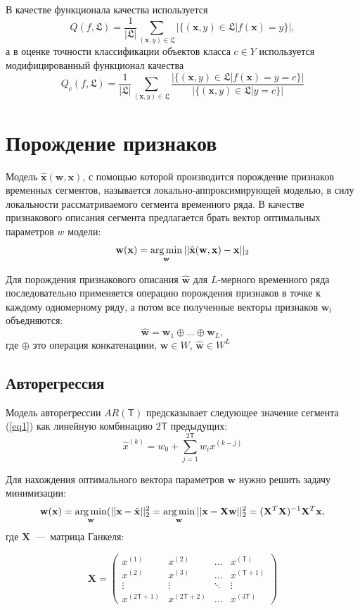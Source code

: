 \documentclass[12pt, twoside]{article}
\begin{document}
В качестве функционала качества используется 
$$Q(f,\mathfrak{L})=\frac{1}{|\mathfrak{L}|}\sum\limits_{(\mathbf{x},y)\in\mathfrak{L}}|\{(\mathbf{x},y)\in\mathfrak{L}|f(\mathbf{x})=y\}|,$$ 
а в оценке точности классификации объектов класса $c\in Y$ используется модифицированный функционал качества 
$$Q_c(f,\mathfrak{L})=\frac{1}{|\mathfrak{L}|}\sum\limits_{(\mathbf{x},y)\in\mathfrak{L}}\frac{|\{(\mathbf{x},y)\in\mathfrak{L}|f(\mathbf{x})=y=c\}|}{|\{(\mathbf{x},y)\in\mathfrak{L}|y=c\}|}$$


\section{Порождение признаков}

Модель $\hat{\mathbf{x}}(\mathbf{w},\mathbf{x})$, с помощью которой производится порождение признаков временных сегментов, называется локально-аппроксимирующей моделью, в силу локальности рассматриваемого сегмента временного ряда. В качестве признакового описания сегмента предлагается брать вектор оптимальных параметров $w$ модели: 
$$\mathbf{w}(\mathbf{x})=\argmin\limits_{\mathbf{w}}||\hat{\mathbf{x}}(\mathbf{w},\mathbf{x})-\mathbf{x}||_2$$

Для порождения признакового описания $\hat{\mathbf{w}}$ для $L$-мерного временного ряда последовательно применяется операцию порождения признаков в точке к каждому одномерному ряду, а потом все полученные векторы признаков $\mathbf{w}_l$ объедняются:
$$\hat{\mathbf{w}} = \mathbf{w}_1\oplus \ldots \oplus \mathbf{w}_L,$$
где $\oplus$ это операция конкатенациии, $\mathbf{w}\in W$, $\hat{\mathbf{w}} \in W^L$


\subsection{Авторегрессия}
Модель авторегрессии $AR(\mathsf{T})$ предсказывает следующее значение сегмента (\ref{eq1}) как линейную комбинацию $2\mathsf{T}$ предыдущих:
$$\hat{x}^{(k)}=w_0+\sum\limits_{j=1}^{2\mathsf{T}} w_i x^{(k-j)}$$

Для нахождения оптимального вектора параметров $\mathbf{w}$ нужно решить задачу минимизации:
$$\mathbf{w}(\mathbf{x})=\argmin_{\mathbf{w}}(||\mathbf{x}-\hat{\mathbf{x}}||_2^2=\argmin_{\mathbf{w}}||\mathbf{x}-\mathbf{X}\mathbf{w}||_2^2=(\mathbf{X}^T\mathbf{X})^{-1}\mathbf{X}^T\mathbf{x},$$
где $\mathbf{X}$~---~матрица Ганкеля:

\begin{equation*}
\mathbf{X} = \left(
\begin{array}{cccc}
x^{(1)} & x^{(2)} & \ldots & x^{(\mathsf{T})}\\
x^{(2)} & x^{(3)} & \ldots & x^{(\mathsf{T}+1)}\\
\vdots & \vdots & \ddots & \vdots\\
x^{(2\mathsf{T}+1)} & x^{(2\mathsf{T}+2)} & \ldots & x^{(3\mathsf{T})}
\end{array}
\right)
\end{equation*}
\end{document}
